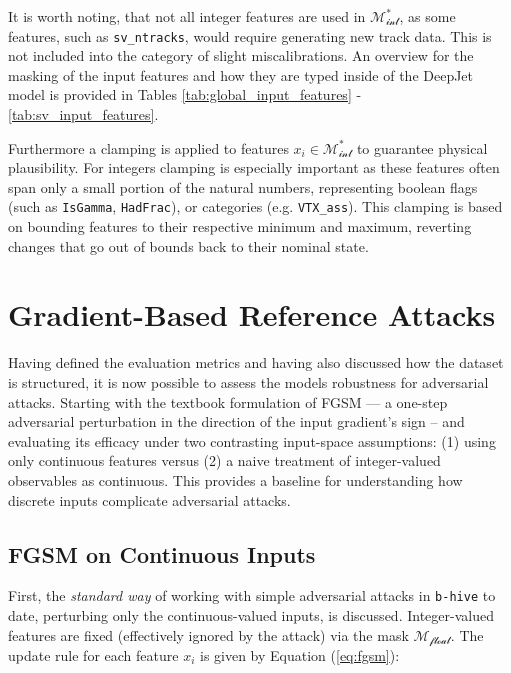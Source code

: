 It is worth noting, that not all integer features are used in $\mathcal{M_{\text{int}}^*}$, as some features, such as \texttt{sv\_ntracks}, would require generating new track data. This is not included into the category of slight miscalibrations.
An overview for the masking of the input features and how they are typed inside of the DeepJet model is provided in Tables \ref{tab:global_input_features} - \ref{tab:sv_input_features}.

Furthermore a clamping is applied to features $x_i\in\mathcal{M_{\text{int}}^*}$ to guarantee physical plausibility. For integers clamping is especially important as these features often span only a small portion of the natural numbers, representing boolean flags (such as \texttt{IsGamma}, \texttt{HadFrac}), or categories (e.g. \texttt{VTX\_ass}). This clamping is based on bounding features to their respective minimum and maximum, reverting changes that go out of bounds back to their nominal state.





\section{Gradient-Based Reference Attacks}
Having defined the evaluation metrics and having also discussed how the dataset is structured, it is now possible to assess the models robustness for adversarial attacks. Starting with the textbook formulation of FGSM — a one-step adversarial perturbation in the direction of the input gradient’s sign \cite{goodfellow2015explainingharnessingadversarialexamples} – and evaluating its efficacy under two contrasting input-space assumptions: (1) using only continuous features versus (2) a naive treatment of integer-valued observables as continuous. This provides a baseline for understanding how discrete inputs complicate adversarial attacks.

\subsection{FGSM on Continuous Inputs}
\label{sec:fgsm_methodology}

First, the \textit{standard way} of working with simple adversarial attacks in \texttt{b-hive} to date, perturbing only the continuous-valued inputs, is discussed. Integer-valued features are fixed (effectively ignored by the attack) via the mask $\mathcal{M_{\text{float}}}$. The update rule for each feature $x_i$ is given by Equation (\ref{eq:fgsm}):

